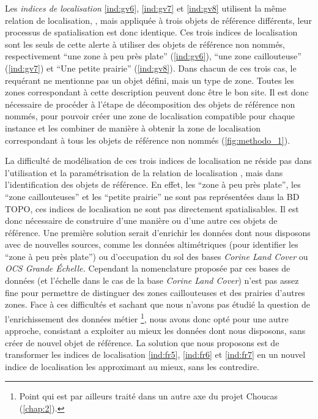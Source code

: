 Les \emph{indices de localisation} \ref{ind:gv6}, \ref{ind:gv7} et
\ref{ind:gv8} utilisent la même relation de localisation,
, mais appliquée à trois objets de
référence différents, leur processus de spatialisation est donc
identique. Ces trois indices de localisation sont les seuls de cette
alerte à utiliser des objets de référence non nommés, respectivement
\enquote{une zone à peu près plate} (\ref{ind:gv6}), \enquote{une zone
  caillouteuse} (\ref{ind:gv7}) et \enquote{Une petite prairie}
(\ref{ind:gv8}). Dans chacun de ces trois cas, le requérant ne
mentionne pas un objet défini, mais un type de zone. Toutes les zones
correspondant à cette description peuvent donc être le bon site. Il
est donc nécessaire de procéder à l'étape de décomposition des objets
de référence non nommés, pour pouvoir créer une zone de localisation
compatible pour chaque instance et les combiner de manière à obtenir
la zone de localisation correspondant à tous les objets de référence
non nommés (\autoref{fig:methodo_1}).

La difficulté de modélisation de ces trois indices de localisation ne
réside pas dans l'utilisation et la paramétrisation de la relation de
localisation , mais dans
l'identification des objets de référence. En effet, les
\enquote{zone à peu près plate}, les
\enquote{zone caillouteuses} et les
\enquote{petite prairie} ne sont pas
représentées dans la BD TOPO, ces indices de localisation ne sont pas
directement spatialisables. Il est donc nécessaire de construire d'une
manière ou d'une autre ces objets de référence. Une première solution
serait d’enrichir les données dont nous disposons avec de nouvelles
sources, comme les données altimétriques (pour identifier les
\enquote{zone à peu près plate}) ou d'occupation
du sol des bases \emph{Corine Land Cover} ou \emph{OCS Grande
  Échelle.} Cependant la nomenclature proposée par ces bases de
données (et l'échelle dans le cas de la base \emph{Corine Land Cover})
n'est pas assez fine pour permettre de distinguer des zones
caillouteuses et des prairies d'autres zones. Face à ces difficultés
et sachant que nous n'avons pas étudié la question de l'enrichissement
des données métier \footnote{Point qui est par ailleurs traité dans un
  autre axe du projet Choucas (\autoref{chap:2}).}, nous avons donc
opté pour une autre approche, consistant a exploiter au mieux les
données dont nous disposons, sans créer de nouvel objet de
référence. La solution que nous proposons est de transformer les
indices de localisation \ref{ind:fr5}, \ref{ind:fr6} et \ref{ind:fr7}
en un nouvel indice de localisation les approximant au mieux, sans les
contredire.



